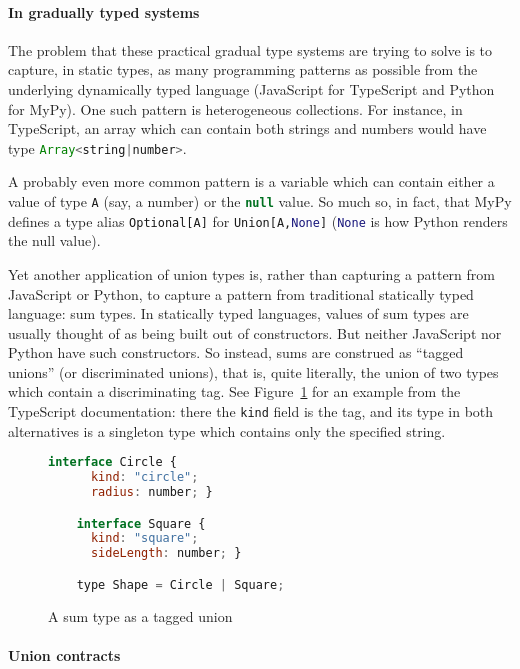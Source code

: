 \documentclass[sigplan,10pt,review,anonymous]{acmart}
\newcommand{\typescript}[1]{\lstinline[language=JavaScript]{#1}}
\newcommand{\python}[1]{\lstinline[language=Python]{#1}}
\begin{document}
\paragraph{In gradually typed systems}

The problem that these practical gradual type systems are trying to solve is to
capture, in static types, as many programming patterns as possible
from the underlying dynamically typed language (JavaScript for
TypeScript and Python for MyPy). One such pattern is
heterogeneous collections. For instance, in TypeScript, an array
which can contain both strings and numbers would have type
\typescript{Array<string|number>}.

A probably even more common pattern is a variable which can contain
either a value of type \typescript{A} (say, a number) or the \typescript{null}
value. So much so, in fact, that MyPy defines a type alias
\python{Optional[A]} for \python{Union[A,None]} (\python{None} is how
Python renders the null value).

Yet another application of union types is, rather than capturing a
pattern from JavaScript or Python, to capture a pattern from
traditional statically typed language: sum types. In statically typed
languages, values of sum types are usually thought of as being built
out of constructors. But neither JavaScript nor Python have such
constructors. So instead, sums are construed as ``tagged unions'' (or
discriminated unions), that is, quite literally, the union of two
types which contain a discriminating tag. See
Figure~\ref{fig:tagged-union} for an example from the TypeScript
documentation: there the \typescript{kind} field is the tag, and its
type in both alternatives is a singleton type which contains only the
specified string.

\begin{figure}
  \centering
  \begin{lstlisting}[language=JavaScript]
    interface Circle {
      kind: "circle";
      radius: number; }

    interface Square {
      kind: "square";
      sideLength: number; }

    type Shape = Circle | Square;
\end{lstlisting}

  \caption{A sum type as a tagged union}
  \label{fig:tagged-union}
\end{figure}

\paragraph{Union contracts}
\end{document}
